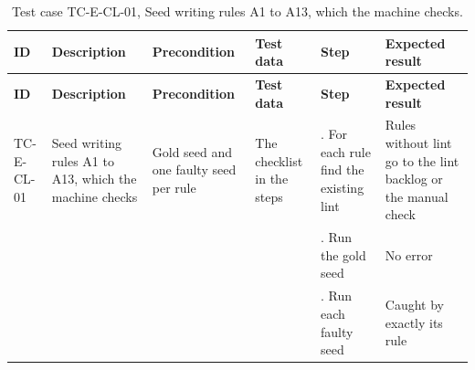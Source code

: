 {\footnotesize{}\renewcommand{\arraystretch}{1.1}
\begin{longtable}{|>{\raggedright\arraybackslash}p{}|>{\raggedright\arraybackslash}p{}|>{\raggedright\arraybackslash}p{}|>{\raggedright\arraybackslash}p{}|>{\raggedright\arraybackslash}p{}|>{\raggedright\arraybackslash}p{}|}
\caption{Test case TC-E-CL-01, Seed writing rules A1 to A13, which the machine checks.} \\
\hline
\textbf{ID} & \textbf{Description} & \textbf{Precondition} & \textbf{Test data} & \textbf{Step} & \textbf{Expected result} \\ \hline
\endfirsthead
\hline
\textbf{ID} & \textbf{Description} & \textbf{Precondition} & \textbf{Test data} & \textbf{Step} & \textbf{Expected result} \\ \hline
\endhead
TC-E-CL-01 & Seed writing rules A1 to A13, which the machine checks & Gold seed and one faulty seed per rule & The checklist in the steps & 1. For each rule find the existing lint & Rules without lint go to the lint backlog or the manual check \\ \cline{5-6}
 &  &  &  & 2. Run the gold seed & No error \\ \cline{5-6}
 &  &  &  & 3. Run each faulty seed & Caught by exactly its rule \\ \hline
\end{longtable}
}

